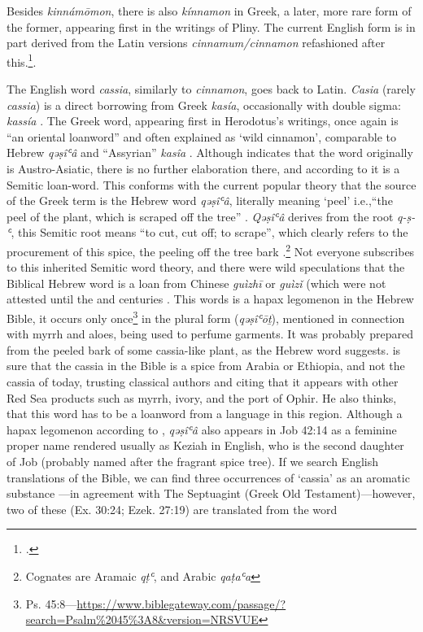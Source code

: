 Besides \textit{kinnámōmon}, there is also  \textit{kínnamon} in Greek, a later, more rare form of the former, appearing first in the writings of Pliny. The current English form is in part derived from the Latin versions \textit{cinnamum/cinnamon} refashioned after this.\footcite[cinnamon]{hoad_concise_2003}.



The English word \textit{cassia}, similarly to \textit{cinnamon}, goes back to Latin. \textit{Casia} (rarely \textit{cassia}) is a direct borrowing from Greek  \textit{kasía}, occasionally with double sigma:  \textit{kassía} . The Greek word, appearing first in Herodotus’s writings, once again is ``an oriental loanword'' and often explained as `wild cinnamon', comparable to Hebrew  \textit{qəṣîʿâ} and ``Assyrian'' \textit{kasîa} \parencite[653]{beekes_etymological_2010}. Although \textcite{beekes_etymological_2010} indicates that the word originally is Austro-Asiatic, there is no further elaboration there, and according to \textcite[342]{welles_royal_1934} it is a Semitic loan-word. This conforms with the current popular theory that the source of the Greek term is the Hebrew word \textit{qəṣîʿâ}, literally meaning `peel’ i.e.,``the peel of the plant, which is scraped off the tree'' \parencite[589]{klein_comprehensive_1987}. \textit{Qəṣîʿâ} derives from the root \textit{q-ṣ-ʿ}, this Semitic root means ``to cut, cut off; to scrape'', which clearly refers to the procurement of this spice, the peeling off the tree bark \parencite{klein_comprehensive_1987}.\footnote{Cognates are Aramaic 
\textit{qṭʿ}, and Arabic 
\textit{qaṭaʿa}} Not everyone subscribes to this inherited Semitic word theory, and there were wild speculations that the Biblical Hebrew word is a loan from Chinese  \textit{guìzhī} or  \textit{guìzǐ} (which were not attested until the  and  centuries \parencite[197]{noonan_non-semitic_2019}. This words is a hapax legomenon in the Hebrew Bible, it occurs only once\footnote{Ps. 45:8---\url{https://www.biblegateway.com/passage/?search=Psalm\%2045\%3A8&version=NRSVUE}} in the plural form (\textit{qəṣîʿōṯ}), mentioned in connection with myrrh and aloes, being used to perfume garments. It was probably prepared from the peeled bark of some cassia-like plant, as the Hebrew word suggests. \parencite[196]{noonan_non-semitic_2019} is sure that the cassia in the Bible is a spice from Arabia or Ethiopia, and not the cassia of today, trusting classical authors and citing that it appears with other Red Sea products such as myrrh, ivory, and the port of Ophir. He also thinks, that this word has to be a loanword from a language in this region. Although a hapax legomenon according to \textcite{klein_comprehensive_1987}, \textit{qəṣîʿâ} also appears in Job 42:14 as a feminine proper name rendered usually as Keziah in English, who is the second daughter of Job (probably named after the fragrant spice tree). If we search English translations of the Bible, we can find three occurrences of `cassia' as an aromatic substance ---in agreement with The Septuagint (Greek Old Testament)---however, two of these (Ex. 30:24; Ezek. 27:19) are translated from the word 

